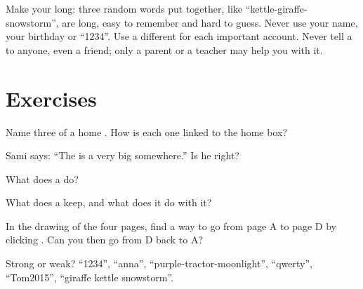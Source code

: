 \begin{safety}
Make your  long: three random words put together, like
``kettle-giraffe-snowstorm'', are long, easy to remember and hard to guess.
Never use your name, your birthday or ``1234''. Use a different  for
each important account. Never tell a  to anyone, even a friend; only a
parent or a teacher may help you with it.
\end{safety}

\section{Exercises}

\begin{exercise}[$\star$]\label{exo:g5:networks-first-look:1}
Name three  of a home . How is each one linked to the home box?
\end{exercise}

\begin{exercise}[$\star$]\label{exo:g5:networks-first-look:2}
Sami says: ``The  is a very big  somewhere.'' Is he right?
\end{exercise}

\begin{exercise}[$\star$]\label{exo:g5:networks-first-look:3}
What does a  do?
\end{exercise}

\begin{exercise}[$\star$]\label{exo:g5:networks-first-look:4}
What does a  keep, and what does it do with it?
\end{exercise}

\begin{exercise}[$\star$]\label{exo:g5:networks-first-look:5}
In the drawing of the four pages, find a way to go from page A to page D by
clicking . Can you then go from D back to A?
\end{exercise}

\begin{exercise}[$\star$]\label{exo:g5:networks-first-look:6}
Strong or weak? ``1234'', ``anna'', ``purple-tractor-moonlight'', ``qwerty'',
``Tom2015'', ``giraffe kettle snowstorm''.
\end{exercise}

